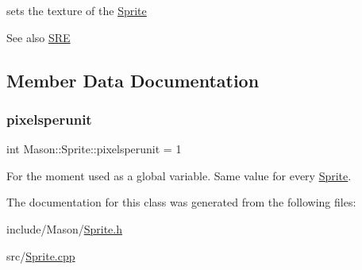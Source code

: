 sets the texture of the \hyperlink{class_mason_1_1_sprite}{Sprite} 

\begin{DoxySeeAlso}{See also}
\hyperlink{namespace_s_r_e}{S\+RE} 
\end{DoxySeeAlso}


\subsection{Member Data Documentation}
\hypertarget{class_mason_1_1_sprite_a5d5ba8a72349d94bbe9190efcb9715cc}{}\label{class_mason_1_1_sprite_a5d5ba8a72349d94bbe9190efcb9715cc} 
\subsubsection{\texorpdfstring{pixelsperunit}{pixelsperunit}}
{\footnotesize\ttfamily int Mason\+::\+Sprite\+::pixelsperunit = 1}



For the moment used as a global variable. Same value for every \hyperlink{class_mason_1_1_sprite}{Sprite}. 



The documentation for this class was generated from the following files\+:\begin{DoxyCompactItemize}
\item 
include/\+Mason/\hyperlink{_sprite_8h}{Sprite.\+h}\item 
src/\hyperlink{_sprite_8cpp}{Sprite.\+cpp}\end{DoxyCompactItemize}
